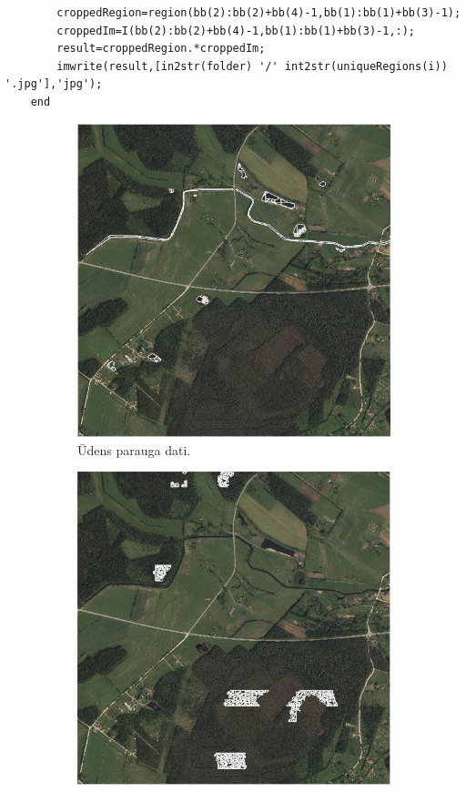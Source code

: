 \documentclass[12pt,paper=a4]{report}
\begin{document}
\begin{lstlisting}
		croppedRegion=region(bb(2):bb(2)+bb(4)-1,bb(1):bb(1)+bb(3)-1);
        croppedIm=I(bb(2):bb(2)+bb(4)-1,bb(1):bb(1)+bb(3)-1,:);
        result=croppedRegion.*croppedIm;
        imwrite(result,[in2str(folder) '/' int2str(uniqueRegions(i)) '.jpg'],'jpg');
    end
\end{lstlisting}
\begin{figure}[h!]
\centering
\begin{subfigure}[b]{.32\linewidth}
\includegraphics[width=\linewidth]{udensSampleNN}
\caption{Ūdens parauga dati.}\label{fig:udensSampleNN}
\end{subfigure}
\begin{subfigure}[b]{.32\linewidth}
\includegraphics[width=\linewidth]{kokiSampleNN}

\end{subfigure}
\end{figure}
\end{document}
